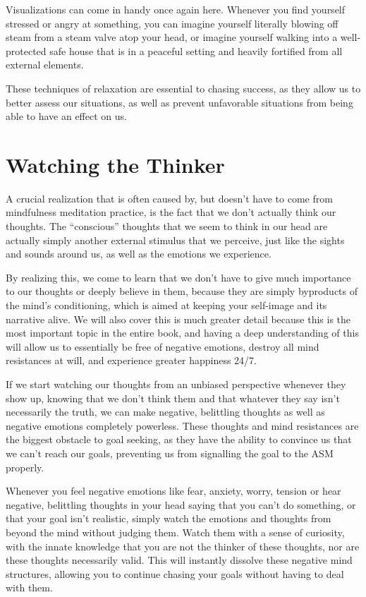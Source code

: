 \documentclass[
]{book}
\begin{document}
Visualizations can come in handy once again here. Whenever you find yourself stressed or angry at something, you can imagine yourself literally blowing off steam from a steam valve atop your head, or imagine yourself walking into a well-protected safe house that is in a peaceful setting and heavily fortified from all external elements.

These techniques of relaxation are essential to chasing success, as they allow us to better assess our situations, as well as prevent unfavorable situations from being able to have an effect on us.

\hypertarget{watching-the-thinker}{%
\section{Watching the Thinker}\label{watching-the-thinker}}

A crucial realization that is often caused by, but doesn't have to come from mindfulness meditation practice, is the fact that we don't actually think our thoughts. The ``conscious'' thoughts that we seem to think in our head are actually simply another external stimulus that we perceive, just like the sights and sounds around us, as well as the emotions we experience.

By realizing this, we come to learn that we don't have to give much importance to our thoughts or deeply believe in them, because they are simply byproducts of the mind's conditioning, which is aimed at keeping your self-image and its narrative alive. We will also cover this is much greater detail because this is the most important topic in the entire book, and having a deep understanding of this will allow us to essentially be free of negative emotions, destroy all mind resistances at will, and experience greater happiness 24/7.

If we start watching our thoughts from an unbiased perspective whenever they show up, knowing that we don't think them and that whatever they say isn't necessarily the truth, we can make negative, belittling thoughts as well as negative emotions completely powerless. These thoughts and mind resistances are the biggest obstacle to goal seeking, as they have the ability to convince us that we can't reach our goals, preventing us from signalling the goal to the ASM properly.

Whenever you feel negative emotions like fear, anxiety, worry, tension or hear negative, belittling thoughts in your head saying that you can't do something, or that your goal isn't realistic, simply watch the emotions and thoughts from beyond the mind without judging them. Watch them with a sense of curiosity, with the innate knowledge that you are not the thinker of these thoughts, nor are these thoughts necessarily valid. This will instantly dissolve these negative mind structures, allowing you to continue chasing your goals without having to deal with them.
\end{document}
